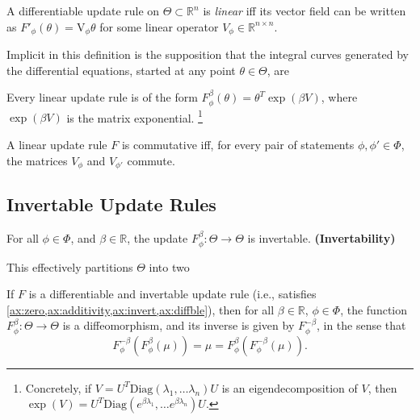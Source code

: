 \documentclass{article}
\begin{document}
\begin{defn}
    A differentiable update rule on $\Theta \subset \mathbb R^n$ is \emph{linear} iff its vector field can be written as
    $F'_\phi(\theta) = \mathrm{V}_\phi \theta$ for some linear operator $V_\phi \in \mathbb R^{n \times n}$.
\end{defn}

Implicit in this definition is the supposition that the integral curves generated by the differential equations, started at any point $\theta \in \Theta$, are 


\begin{prop}
    Every linear update rule is of the form
    $
        F^{\beta}_\phi(\theta) =  \theta^{T} \exp(\beta V)
    $,
    where $\exp(\beta V)$ is the matrix exponential.%
        \footnote{Concretely, if $V = U^T \mathrm{Diag}(\lambda_1, \ldots \lambda_n) U$ is an eigendecomposition of $V$, then $\exp(V) = U^T \mathrm{Diag}(e^{\beta\lambda_1}, \ldots e^{\beta\lambda_n}) U$.}
\end{prop}

\begin{prop}
    A linear update rule $F$ is commutative iff, for every pair of statements  $\phi, \phi' \in \Phi$, the
    matrices $V_\phi$ and $V_{\phi'}$ commute.
\end{prop}



\subsection{Invertable Update Rules}
\begin{URaxioms}
    \item For all $\phi\in\Phi$, and $\beta \in \mathbb R$, the update
    $F^{\beta}_{\phi}: \Theta \to \Theta$ is invertable.
    \hfill\textbf{(Invertability)} \label{ax:invert}
\end{URaxioms}


This effectively partitions $\Theta$ into two 


\begin{prop}
    If $F$ is a differentiable and invertable update rule (i.e., satisfies \cref{ax:zero,ax:additivity,ax:invert,ax:diffble}), then for all $\beta \in \mathbb R$, $\phi \in \Phi$, the function
    $F^\beta_\phi : \Theta \to \Theta$
    is a diffeomorphism, and its inverse is given by $F^{-\beta}_\phi$, in the sense that
    \[
        F^{-\beta}_\phi( F^{\beta}_\phi (\mu) ) = \mu = F^{\beta}_\phi( F^{-\beta}_\phi (\mu) ).
     \]
\end{prop}
\end{document}
